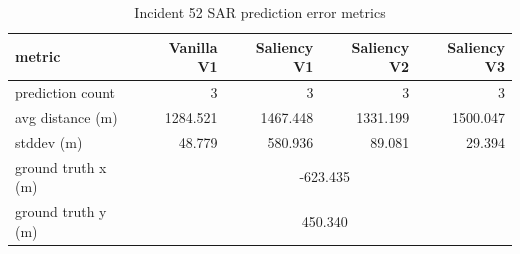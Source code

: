 \begin{table}[ht]
\centering
\caption{Incident 52 SAR prediction error metrics}
\label{tab:sar-incident-52}
\begin{tabular}{lrrrr}
\hline
metric & Vanilla V1 & Saliency V1 & Saliency V2 & Saliency V3 \\
\hline
prediction count & 3 & 3 & 3 & 3 \\
avg distance (m) & 1284.521 & 1467.448 & 1331.199 & 1500.047 \\
stddev (m) & 48.779 & 580.936 & 89.081 & 29.394 \\
ground truth x (m) & \multicolumn{4}{c}{-623.435} \\
ground truth y (m) & \multicolumn{4}{c}{450.340} \\
\hline
\end{tabular}
\end{table}
